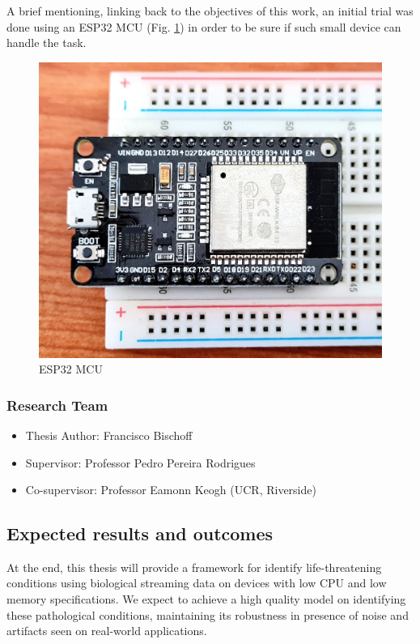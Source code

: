 \documentclass[runningheads]{llncs}
\providecommand{\tightlist}{%
  \setlength{\itemsep}{0pt}\setlength{\parskip}{0pt}}
\begin{document}
A brief mentioning, linking back to the objectives of this work, an initial trial was done using an
ESP32 MCU (Fig. \ref{fig:esp32}) in order to be sure if such small device can handle the task.

\begin{figure}

{\centering \includegraphics[width=0.5\linewidth]{../../docs/figure/esp32} 

}

\caption{ESP32 MCU}\label{fig:esp32}
\end{figure}

\hypertarget{research-team}{%
\subsubsection{Research Team}\label{research-team}}

\begin{itemize}
\tightlist
\item
  Thesis Author: Francisco Bischoff
\item
  Supervisor: Professor Pedro Pereira Rodrigues
\item
  Co-supervisor: Professor Eamonn Keogh (UCR, Riverside)
\end{itemize}

\hypertarget{expected-results-and-outcomes}{%
\subsection{Expected results and outcomes}\label{expected-results-and-outcomes}}

At the end, this thesis will provide a framework for identify life-threatening conditions using
biological streaming data on devices with low CPU and low memory specifications. We expect
to achieve a high quality model on identifying these pathological conditions, maintaining its
robustness in presence of noise and artifacts seen on real-world applications.
\end{document}
